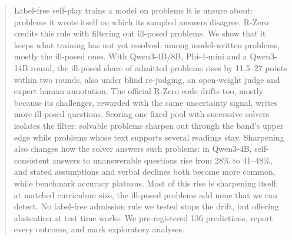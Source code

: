 \begin{abstract}
Label-free self-play trains a model on problems it is unsure about: problems it wrote itself on which its sampled answers disagree. R-Zero credits this rule with filtering out ill-posed problems. We show that it keeps what training has not yet resolved: among model-written problems, mostly the ill-posed ones. With Qwen3-4B/8B, Phi-4-mini and a Qwen3-14B round, the ill-posed share of admitted problems rises by 11.5--27 points within two rounds, also under blind re-judging, an open-weight judge and expert human annotation. The official R-Zero code drifts too, mostly because its challenger, rewarded with the same uncertainty signal, writes more ill-posed questions. Scoring one fixed pool with successive solvers isolates the filter: solvable problems sharpen out through the band's upper edge while problems whose text supports several readings stay. Sharpening also changes how the solver answers such problems: in Qwen3-4B, self-consistent answers to unanswerable questions rise from 28\% to 41--48\%, and stated assumptions and verbal declines both become more common, while benchmark accuracy plateaus. Most of this rise is sharpening itself; at matched curriculum size, the ill-posed problems add none that we can detect. No label-free admission rule we tested stops the drift, but offering abstention at test time works. We pre-registered 136 predictions, report every outcome, and mark exploratory analyses.
\end{abstract}
